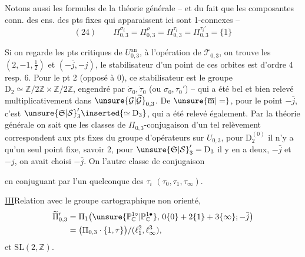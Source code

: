Notons aussi  les formules  de la théorie générale -- et du fait que les composantes conn. des ens. des pts fixes qui apparaissent ici sont 1-connexes --
\[
(24)\qquad
\Pi_{0,3}^{\sigma_i}=\Pi_{0,3}^{\rho}
=\Pi_{0,3}^{\tau_i}=\Pi_{0,3}^{\tau_i'}=\{1\}
\]

Si on regarde les pts critiques de $U_{0,3}^{\mathrm{an}}$,  à l'opération de $\mathcal{T}_{0,3}$, on trouve les  $(2,-1,\frac12)$ et $(-\bar j,-j)$, le stabilisateur d'un point de ces orbites est d'ordre 4 resp. 6.
Pour le pt 2 (opposé à 0), ce stabilisateur est le groupe $\mathrm{D}_2\simeq\mathbb{Z}/2\mathbb{Z}\times\mathbb{Z}/2\mathbb{Z}$, engendré par $\dot\sigma_0,\dot\tau_0$ (ou $\sigma_0,\tau_0'$) -- qui a été bel et bien relevé multiplicativement dans $\unsure{\mathcal{G}|\widetilde{\mathcal{G}}}_{0,3}$.
De $\unsure{\overline{\mathrm m}|=}$, pour le point $-\bar j$, c'est $\unsure{\mathfrak{S}|\mathcal{S}}_3'\inserted{\simeq\mathrm{D}_3}$, qui a été relevé également.
Par la théorie générale on sait que les classes de $\Pi_{0,3}$-conjugaison d'un tel relèvement correspondent aux pts fixes du groupe d'opérateurs  sur $U_{0,3}$, pour $\mathrm{D}_2^{(0)}$ il n'y a qu'un seul point fixe, savoir 2, pour $\unsure{\mathfrak{S}|\mathcal{S}}_3'=\mathrm{D}_3$ il y en a deux, $-\bar j$ et $-j$, on avait choisi $-\bar j$.
On  l'autre classe de conjugaison



en conjuguant par l'un quelconque des $\tau_i$ $(\tau_0,\tau_1,\tau_\infty)$.

\uline{III}\quad Relation avec le groupe cartographique  non orienté,
\[
\begin{aligned}
\widetilde{\Pi}_{0,3}'
&=\Pi_1\bigl(\unsure{\mathbb{P}_{\mathbb{C}}^{1\circ}|\mathbb{P}_{\mathbb{C}}^{1\bullet}},\,
0\{0\}+2\{1\}+3\{\infty\};-\bar j\bigr)\\
&=\bigl(\Pi_{0,3}\cdot\{1,\tau\}\bigr)/(\ell_1^2,\ell_\infty^3),
\end{aligned}
\]
et  $\mathrm{SL}(2,\mathbb{Z})$.

